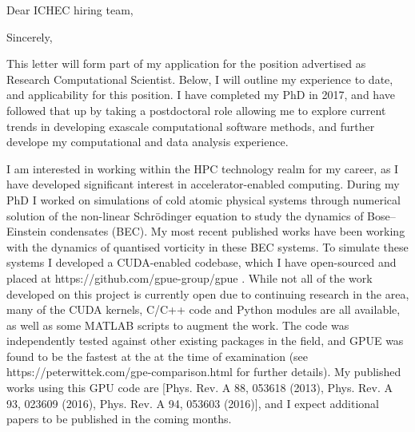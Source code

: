 \documentclass[11pt,a4paper,unicode]{moderncv}
\begin{document}
\clearpage
\iffalse
{} %
\date{\today} %
\opening{Dear ICHEC hiring team,} %
\closing{Sincerely,} %
%
\makelettertitle
%
{This letter will form part of my application for the position advertised as Research Computational Scientist. Below, I will outline my experience to date, and applicability for this position. I have completed my PhD in 2017, and have followed that up by taking a postdoctoral role allowing me to explore current trends in developing exascale computational software methods, and further develope my computational and data analysis experience.

I am interested in working within the HPC technology realm for my career, as I have developed significant interest in accelerator-enabled computing. During my PhD I worked on simulations of cold atomic physical systems through numerical solution of the non-linear Schr\"odinger equation to study the dynamics of Bose--Einstein condensates (BEC). My most recent published works have been working with the dynamics of quantised vorticity in these BEC systems. To simulate these systems I developed a CUDA-enabled codebase, which I have open-sourced and placed at https://github.com/gpue-group/gpue .  While not all of the work developed on this project is currently open due to continuing research in the area, many of the CUDA kernels, C/C++ code and Python modules are all available, as well as some MATLAB scripts to augment the work. The code was independently tested against other existing packages in the field, and GPUE was found to be the fastest at the at the time of examination (see https://peterwittek.com/gpe-comparison.html for further details). My published works using this GPU code are [Phys. Rev. A 88, 053618 (2013), Phys. Rev. A 93, 023609 (2016), Phys. Rev. A 94, 053603 (2016)], and I expect additional papers to be published in the coming months.

}
\end{document}
